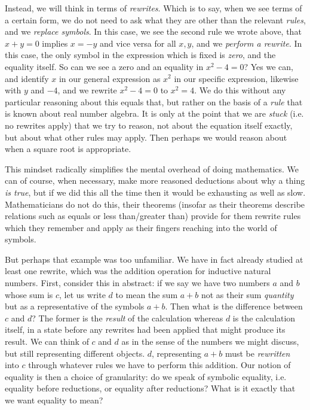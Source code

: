 \documentclass[11pt]{article}
\begin{document}
Instead, we will think in terms of \emph{rewrites}. Which is to say, when we see terms of a certain form, we do not need to ask what they are other than the relevant \emph{rules}, and we \emph{replace symbols}. In this case, we see the second rule we wrote above, that $x + y = 0$ implies $x = -y$ and vice versa for all $x,y$, and we \emph{perform a rewrite}. In this case, the only symbol in the expression which is fixed is \emph{zero}, and the equality itself. So can we see a zero and an equality in $x^2 - 4 = 0$? Yes we can, and identify $x$ in our general expression as $x^2$ in our specific expression, likewise with $y$ and $-4$, and we rewrite $x^2 - 4 = 0$ to $x^2 = 4$. We do this without any particular reasoning about this equals that, but rather on the basis of a \emph{rule} that is known about real number algebra. It is only at the point that we are \emph{stuck} (i.e. no rewrites apply) that we try to reason, not about the equation itself exactly, but about what other rules may apply. Then perhaps we would reason about when a square root is appropriate.

This mindset radically simplifies the mental overhead of doing mathematics. We can of course, when necessary, make more reasoned deductions about why a thing \emph{is true}, but if we did this all the time then it would be exhausting as well as slow. Mathematicians do not do this, their theorems (insofar as their theorems describe relations such as equals or less than/greater than) provide for them rewrite rules which they remember and apply as their fingers reaching into the world of symbols.

But perhaps that example was too unfamiliar. We have in fact already studied at least one rewrite, which was the addition operation for inductive natural numbers. First, consider this in abstract: if we say we have two numbers $a$ and $b$ whose sum is $c$, let us write $d$ to mean the sum $a+b$ not as their sum \emph{quantity} but as a representative of the symbols $a + b$. Then what is the difference between $c$ and $d$? The former is the \emph{result} of the calculation whereas $d$ is the calculation itself, in a state before any rewrites had been applied that might produce its result. We can think of $c$ and $d$ as  in the sense of the numbers we might discuss, but still representing different objects. $d$, representing $a + b$ must be \emph{rewritten} into $c$ through whatever rules we have to perform this addition. Our notion of equality is then a choice of granularity: do we speak of symbolic equality, i.e. equality before reductions, or equality after reductions? What is it exactly that we want equality to mean?
\end{document}
